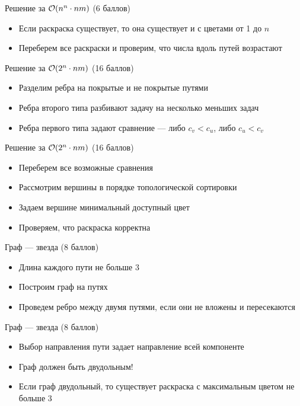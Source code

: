 \begin{frame}{Решение за $\mathcal{O}(n^n \cdot nm)$ (6 баллов)}
  \begin{itemize}
  \item Если раскраска существует, то она существует и с цветами от 1 до $n$
  \item Переберем все раскраски и проверим, что числа вдоль путей возрастают
  \end{itemize}
\end{frame}
\begin{frame}{Решение за $\mathcal{O}(2^n \cdot nm)$ (16 баллов)}
  \begin{itemize}
  \item Разделим ребра на покрытые и не покрытые путями
  \item Ребра второго типа разбивают задачу на несколько меньших задач
  \item Ребра первого типа задают сравнение --- либо $c_v < c_u$, либо $c_u < c_v$
  \end{itemize}
\end{frame}
\begin{frame}{Решение за $\mathcal{O}(2^n \cdot nm)$ (16 баллов)}
  \begin{itemize}
  \item Переберем все возможные сравнения
  \item Рассмотрим вершины в порядке топологической сортировки
  \item Задаем вершине минимальный доступный цвет
  \item Проверяем, что раскраска корректна
  \end{itemize}
\end{frame}

\begin{frame}{Граф --- звезда (8 баллов)}
  \begin{itemize}
  \item Длина каждого пути не больше 3
  \item Построим граф на путях
  \item Проведем ребро между двумя путями, если они не вложены и пересекаются
  \end{itemize}
\end{frame}

\begin{frame}{Граф --- звезда (8 баллов)}
  \begin{itemize}
  \item Выбор направления пути задает направление всей компоненте
  \item Граф должен быть двудольным!
  \item Если граф двудольный, то существует раскраска с максимальным цветом не больше 3
  \end{itemize}
\end{frame}

